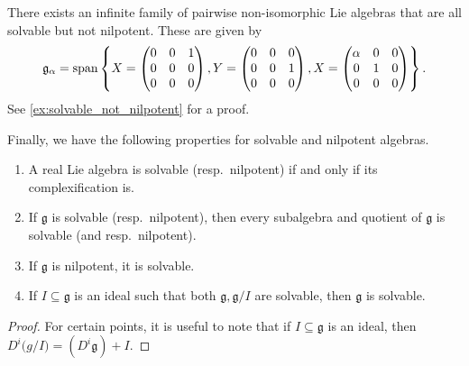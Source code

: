 \documentclass{report}
\begin{document}
\begin{example}
    There exists an infinite family of pairwise non-isomorphic Lie algebras that are all solvable but not nilpotent.
    These are given by
    \[
    \mathfrak g_\alpha = \operatorname{span}\left\{
    X = \begin{pmatrix}
        0 & 0 & 1\\
        0 & 0 & 0\\
        0 & 0 & 0
    \end{pmatrix},
    Y = \begin{pmatrix}
        0 & 0 & 0\\
        0 & 0 & 1\\
        0 & 0 & 0
    \end{pmatrix},
    X = \begin{pmatrix}
        \alpha & 0 & 0\\
        0 & 1 & 0\\
        0 & 0 & 0
    \end{pmatrix}
    \right\}.
    \]
    See \cref{ex:solvable_not_nilpotent} for a proof.
\end{example}
Finally, we have the following properties for solvable and nilpotent algebras.
\begin{proposition}
    \begin{enumerate}[label = (\roman*)]
        \item A real Lie algebra is solvable (resp.\ nilpotent) if and only if its complexification is.
        \item If $\mathfrak g$ is solvable (resp.\ nilpotent), then every subalgebra and quotient of $\mathfrak g$ is solvable (and resp.\ nilpotent).
        \item If $\mathfrak g$ is nilpotent, it is solvable.
        \item If $I \subseteq \mathfrak g$ is an ideal such that both $\mathfrak g, \mathfrak g/I$ are solvable, then $\mathfrak g$ is solvable.
    \end{enumerate}
\end{proposition}
\begin{proof}
For certain points, it is useful to note that if $I\subseteq \mathfrak g$ is an ideal, then $D^i \mathfrak (g/I) = (D^i \mathfrak g) + I$.
\end{proof}
\end{document}
